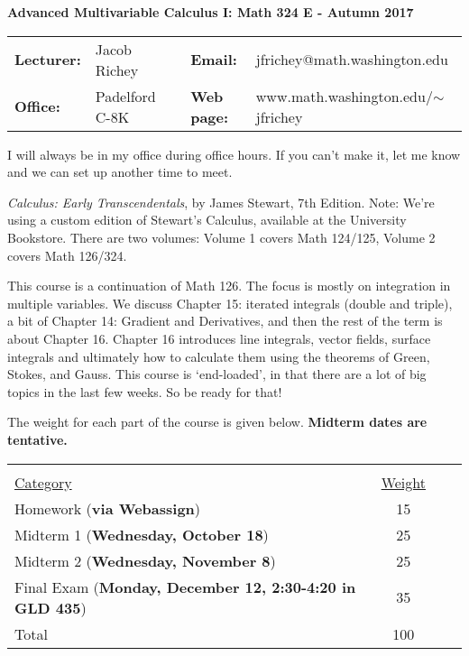 \documentclass[11 pt]{report}
\begin{document}
\centerline{\bf Advanced Multivariable Calculus I: Math 324 E - Autumn 2017}
\vspace{0.2cm}
\begin{tabular}{lllll}
{\bf Lecturer: }    & Jacob Richey &  & {\bf Email: }       & jfrichey@math.washington.edu \\
{\bf Office: }      & Padelford C-8K        &  & {\bf Web page: }    & www.math.washington.edu/$\sim$jfrichey \\
\end{tabular}
\vspace{0.25cm}

I will always be in my office during office hours. If you can't make it, let me know and we can set up another time to meet.  \vspace{0.25cm}

 \emph{Calculus: Early Transcendentals}, by James Stewart, 7th
Edition. Note: We're using a custom edition of Stewart's Calculus,
available at the University Bookstore.  There are two volumes:
Volume 1 covers Math 124/125, Volume 2 covers Math 126/324. 

\vspace{0.25cm}

  This course is a continuation of
Math 126.  The focus is mostly on integration in multiple variables.
We discuss Chapter 15: iterated integrals (double and triple), a bit
of Chapter 14: Gradient and Derivatives, and then the rest of the
term is about Chapter 16.  Chapter 16 introduces line integrals,
vector fields, surface integrals and ultimately how to calculate
them using the theorems of Green, Stokes, and Gauss.  This course is
`end-loaded', in that there are a lot of big topics in the last few
weeks.  So be ready for that!

\vspace{0.25cm}

 The weight for each part of the course is given
below. \textbf{Midterm dates are tentative.}

\vspace{-.25in}

\begin{center}\begin{tabular}{lccl} &  \\
\underline{Category} & \underline{Weight}  \\
Homework   ({\bf via Webassign})                 & 15  \\
Midterm 1  ({\bf Wednesday, October 18})                   & 25  \\
Midterm 2  ({\bf Wednesday, November 8})                   & 25   \\
Final Exam ({\bf Monday, December 12, 2:30-4:20 in GLD 435})                        & 35  \\
\hline Total                                        & 100
\end{tabular}
\end{center}
\end{document}
